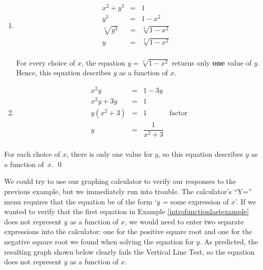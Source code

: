 \begin{ex}
\begin{enumerate}
\item  \[ \begin{array}{rclr} 
          x^2 + y^3 & = & 1 & \\
          y^3 & = & 1 - x^2 & \\
          \sqrt[3]{y^3} & = & \sqrt[3]{1 - x^2} & \\
          y & = & \sqrt[3]{1 - x^2} & \\ 
          \end{array} \]

For every choice of $x$, the equation $y =  \sqrt[3]{1 - x^2}$ returns only \textbf{one} value of $y$.  Hence, this equation describes $y$ as a function of $x$.

\item  \[ \begin{array}{rclr} 
          x^2y & = & 1 - 3y & \\
          x^2y + 3y & = & 1 & \\
          y \left(x^2 + 3\right) & = & 1 & \mbox{factor} \\
          y & = & \dfrac{1}{x^2 + 3} & \\ 
          \end{array} \]


\end{enumerate}

For each choice of $x$, there is only one value for $y$, so this equation describes $y$ as a function of~$x$.  \qed

\medskip

We could try to use our graphing calculator to verify our responses to the previous example, but we immediately run into trouble.  The calculator's ``Y='' menu requires that the equation be of the form `$y$ = some expression of $x$'. If we wanted to verify that the first equation in Example \ref{introfunctionlastexample} does not represent $y$ as a function of $x$, we would need to enter two separate expressions into the calculator: one for the positive square root and one for the negative square root we found when solving the equation for $y$. As predicted, the resulting graph shown below clearly fails the Vertical Line Test, so the equation does not represent $y$ as a function of $x$. 

\begin{center}

\begin{tabular}{cc}


\end{tabular}
\end{center}
\end{ex}
